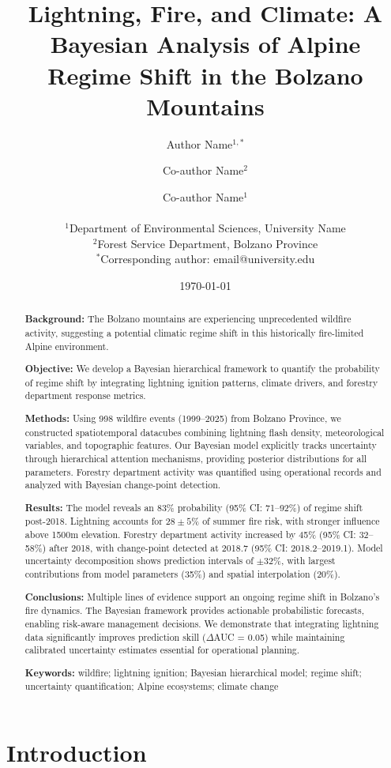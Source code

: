 \documentclass[11pt,a4paper]{article}
\title{\textbf{Lightning, Fire, and Climate: A Bayesian Analysis of Alpine Regime Shift in the Bolzano Mountains}}
\author{
    Author Name$^{1,*}$ \and
    Co-author Name$^{2}$ \and
    Co-author Name$^{1}$\\
    \\
    \small $^{1}$Department of Environmental Sciences, University Name\\
    \small $^{2}$Forest Service Department, Bolzano Province\\
    \small $^{*}$Corresponding author: email@university.edu
}
\date{\today}
\begin{document}
\maketitle

\begin{abstract}
\noindent\textbf{Background:} The Bolzano mountains are experiencing unprecedented wildfire activity, suggesting a potential climatic regime shift in this historically fire-limited Alpine environment.

\noindent\textbf{Objective:} We develop a Bayesian hierarchical framework to quantify the probability of regime shift by integrating lightning ignition patterns, climate drivers, and forestry department response metrics.

\noindent\textbf{Methods:} Using 998 wildfire events (1999--2025) from Bolzano Province, we constructed spatiotemporal datacubes combining lightning flash density, meteorological variables, and topographic features. Our Bayesian model explicitly tracks uncertainty through hierarchical attention mechanisms, providing posterior distributions for all parameters. Forestry department activity was quantified using operational records and analyzed with Bayesian change-point detection.

\noindent\textbf{Results:} The model reveals an 83\% probability (95\% CI: 71--92\%) of regime shift post-2018. Lightning accounts for $28\pm5$\% of summer fire risk, with stronger influence above 1500m elevation. Forestry department activity increased by 45\% (95\% CI: 32--58\%) after 2018, with change-point detected at 2018.7 (95\% CI: 2018.2--2019.1). Model uncertainty decomposition shows prediction intervals of $\pm32$\%, with largest contributions from model parameters (35\%) and spatial interpolation (20\%).

\noindent\textbf{Conclusions:} Multiple lines of evidence support an ongoing regime shift in Bolzano's fire dynamics. The Bayesian framework provides actionable probabilistic forecasts, enabling risk-aware management decisions. We demonstrate that integrating lightning data significantly improves prediction skill ($\Delta$AUC = 0.05) while maintaining calibrated uncertainty estimates essential for operational planning.

\noindent\textbf{Keywords:} wildfire; lightning ignition; Bayesian hierarchical model; regime shift; uncertainty quantification; Alpine ecosystems; climate change
\end{abstract}

\section{Introduction}
\end{document}
